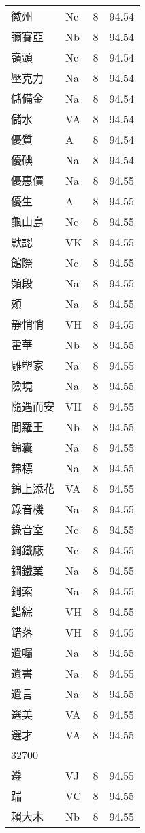\documentclass[twocolumn]{book}
\begin{document}
\begin{supertabular}{llrr}
徽州 & Nc & 8 &  94.54\\
彌賽亞 & Nb & 8 &  94.54\\
嶺頭 & Nc & 8 &  94.54\\
壓克力 & Na & 8 &  94.54\\
儲備金 & Na & 8 &  94.54\\
儲水 & VA & 8 &  94.54\\
優質 & A & 8 &  94.54\\
優碘 & Na & 8 &  94.54\\
優惠價 & Na & 8 &  94.55\\
優生 & A & 8 &  94.55\\
龜山島 & Nc & 8 &  94.55\\
默認 & VK & 8 &  94.55\\
館際 & Nc & 8 &  94.55\\
頻段 & Na & 8 &  94.55\\
頰 & Na & 8 &  94.55\\
靜悄悄 & VH & 8 &  94.55\\
霍華 & Nb & 8 &  94.55\\
雕塑家 & Na & 8 &  94.55\\
險境 & Na & 8 &  94.55\\
隨遇而安 & VH & 8 &  94.55\\
閻羅王 & Nb & 8 &  94.55\\
錦囊 & Na & 8 &  94.55\\
錦標 & Na & 8 &  94.55\\
錦上添花 & VA & 8 &  94.55\\
錄音機 & Na & 8 &  94.55\\
錄音室 & Nc & 8 &  94.55\\
鋼鐵廠 & Nc & 8 &  94.55\\
鋼鐵業 & Na & 8 &  94.55\\
鋼索 & Na & 8 &  94.55\\
錯綜 & VH & 8 &  94.55\\
錯落 & VH & 8 &  94.55\\
遺囑 & Na & 8 &  94.55\\
遺書 & Na & 8 &  94.55\\
遺言 & Na & 8 &  94.55\\
選美 & VA & 8 &  94.55\\
選才 & VA & 8 &  94.55\\
32700\\
遵 & VJ & 8 &  94.55\\
踹 & VC & 8 &  94.55\\
賴大木 & Nb & 8 &  94.55\\

\end{supertabular}
\end{document}
